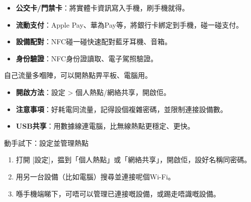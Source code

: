 
\begin{itemize}
  \item \textbf{公交卡/門禁卡}：將實體卡資訊寫入手機，刷手機就得。
  \item \textbf{流動支付}：Apple Pay、華為Pay等，將銀行卡綁定到手機，碰一碰支付。
  \item \textbf{設備配對}：NFC碰一碰快速配對藍牙耳機、音箱。
  \item \textbf{身份驗證}：NFC身份證讀取、電子駕照驗證。
\end{itemize}


自己流量多嗰陣，可以開熱點畀平板、電腦用。

\begin{itemize}
  \item \textbf{開啟方法}：設定 > 個人熱點/網絡共享，開啟佢。
  \item \textbf{注意事項}：好耗電同流量，記得設個複雜密碼，並限制連接設備數。
  \item \textbf{USB共享}：用數據線連電腦，比無線熱點更穩定、更快。
\end{itemize}

\begin{tcbpractice}{動手試下：設定並管理熱點}
\begin{enumerate}
  \item 打開 [設定]，揾到「個人熱點」或「網絡共享」，開啟佢，設好名稱同密碼。
  \item 用另一台設備（比如電腦）搜尋並連接呢個Wi-Fi。
  \item 喺手機端睇下，可唔可以管理已連接嘅設備，或踢走唔識嘅設備。
\end{enumerate}

\end{tcbpractice}
